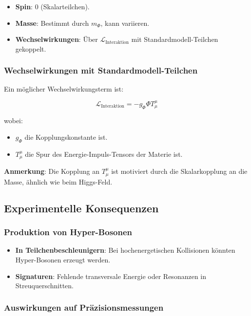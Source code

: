 \documentclass[11pt,a4paper]{article}
\begin{document}
\begin{itemize}
    \item \textbf{Spin}: 0 (Skalarteilchen).
    \item \textbf{Masse}: Bestimmt durch $m_\Phi$, kann variieren.
    \item \textbf{Wechselwirkungen}: Über $\mathcal{L}_{\text{Interaktion}}$ mit Standardmodell-Teilchen gekoppelt.
\end{itemize}

\subsubsection{Wechselwirkungen mit Standardmodell-Teilchen}

Ein möglicher Wechselwirkungsterm ist:

\begin{equation}
\mathcal{L}_{\text{Interaktion}} = - g_\Phi \Phi T^\mu_\mu
\end{equation}

wobei:

\begin{itemize}
    \item $g_\Phi$ die Kopplungskonstante ist.
    \item $T^\mu_\mu$ die Spur des Energie-Impuls-Tensors der Materie ist.
\end{itemize}

\textbf{Anmerkung}: Die Kopplung an $T^\mu_\mu$ ist motiviert durch die Skalarkopplung an die Masse, ähnlich wie beim Higgs-Feld.

\subsection{Experimentelle Konsequenzen}

\subsubsection{Produktion von Hyper-Bosonen}

\begin{itemize}
    \item \textbf{In Teilchenbeschleunigern}: Bei hochenergetischen Kollisionen könnten Hyper-Bosonen erzeugt werden.
    \item \textbf{Signaturen}: Fehlende transversale Energie oder Resonanzen in Streuquerschnitten.
\end{itemize}

\subsubsection{Auswirkungen auf Präzisionsmessungen}
\end{document}
